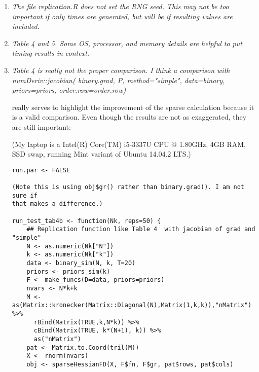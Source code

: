 \documentclass{article}
\newenvironment{revQuote}{\itshape}{\vspace{\baselineskip}}
\newenvironment{response}{\normalfont}{\vspace{\baselineskip}}
\begin{document}
\begin{enumerate}
\item \begin{revQuote}
 The file replication.R does not set the RNG seed. This may not be too
important if only times are generated, but will be if resulting values are
included.
    
  \end{revQuote}

\begin{response}
  
\end{response}


\item \begin{revQuote}
Table 4 and 5. Some OS, processor, and memory details are helpful to put
timing results in context.
  \end{revQuote}

\begin{response}
  
\end{response}


\item\begin{revQuote}
Table 4 is really not the proper comparison. I think a comparison with
       numDeriv::jacobian( binary.grad, P, method="simple", 
                   data=binary, priors=priors,
order.row=order.row)

really serves to highlight the improvement of the sparse calculation because
it is a valid comparison. Even though the results are not as exaggerated,
they are still important:

(My laptop is a  Intel(R) Core(TM) i5-3337U CPU @ 1.80GHz,  4GB RAM, SSD
swap, running Mint variant of Ubuntu 14.04.2 LTS.)

\begin{verbatim}
run.par <- FALSE

(Note this is using obj$gr() rather than binary.grad(). I am not sure if
that makes a difference.)

run_test_tab4b <- function(Nk, reps=50) {
    ## Replication function like Table 4  with jacobian of grad and
"simple"
    N <- as.numeric(Nk["N"])
    k <- as.numeric(Nk["k"])
    data <- binary_sim(N, k, T=20)
    priors <- priors_sim(k)
    F <- make_funcs(D=data, priors=priors)
    nvars <- N*k+k
    M <-
as(Matrix::kronecker(Matrix::Diagonal(N),Matrix(1,k,k)),"nMatrix") %>%
      rBind(Matrix(TRUE,k,N*k)) %>%
      cBind(Matrix(TRUE, k*(N+1), k)) %>%
      as("nMatrix")
    pat <- Matrix.to.Coord(tril(M))
    X <- rnorm(nvars)
    obj <- sparseHessianFD(X, F$fn, F$gr, pat$rows, pat$cols)


\end{verbatim}
\end{revQuote}
\end{enumerate}
\end{document}
